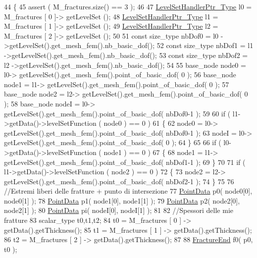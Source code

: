 \begin{DoxyCode}
44 \{   
45     assert ( M\_fractures.size() == 3 );
46     
47     \hyperlink{LevelSetHandler_8h_aba343569cb3213c103252f69c39cad0b}{LevelSetHandlerPtr\_Type} l0 = M\_fractures [ 0 ]-> getLevelSet ();
48     \hyperlink{LevelSetHandler_8h_aba343569cb3213c103252f69c39cad0b}{LevelSetHandlerPtr\_Type} l1 = M\_fractures [ 1 ]-> getLevelSet ();
49     \hyperlink{LevelSetHandler_8h_aba343569cb3213c103252f69c39cad0b}{LevelSetHandlerPtr\_Type} l2 = M\_fractures [ 2 ]-> getLevelSet ();
50     
51     \textcolor{keyword}{const} size\_type nbDof0 = l0 ->getLevelSet().get\_mesh\_fem().nb\_basic\_dof();
52     \textcolor{keyword}{const} size\_type nbDof1 = l1 ->getLevelSet().get\_mesh\_fem().nb\_basic\_dof();
53     \textcolor{keyword}{const} size\_type nbDof2 = l2 ->getLevelSet().get\_mesh\_fem().nb\_basic\_dof();
54     
55     base\_node node0 = l0-> getLevelSet().get\_mesh\_fem().point\_of\_basic\_dof( 0 );
56     base\_node node1 = l1-> getLevelSet().get\_mesh\_fem().point\_of\_basic\_dof( 0 );
57     base\_node node2 = l2-> getLevelSet().get\_mesh\_fem().point\_of\_basic\_dof( 0 );
58     base\_node nodeI = l0-> getLevelSet().get\_mesh\_fem().point\_of\_basic\_dof( nbDof0-1 );
59 
60     \textcolor{keywordflow}{if} ( l1->getData()->levelSetFunction ( node0 ) == 0 )
61     \{
62         node0 = l0-> getLevelSet().get\_mesh\_fem().point\_of\_basic\_dof( nbDof0-1 );
63         nodeI = l0-> getLevelSet().get\_mesh\_fem().point\_of\_basic\_dof( 0 );
64     \}
65 
66     \textcolor{keywordflow}{if} ( l0->getData()->levelSetFunction ( node1 ) == 0 )
67     \{
68         node1 = l1-> getLevelSet().get\_mesh\_fem().point\_of\_basic\_dof( nbDof1-1 );
69     \}
70 
71     \textcolor{keywordflow}{if} ( l1->getData()->levelSetFunction ( node2 ) == 0 )
72     \{
73         node2 = l2->  getLevelSet().get\_mesh\_fem().point\_of\_basic\_dof( nbDof2-1 );
74     \}
75 
76     \textcolor{comment}{//Estremi liberi delle fratture +  punto di intersezione}
77     \hyperlink{classPointData}{PointData} p0( node0[0], node0[1] );
78     \hyperlink{classPointData}{PointData} p1( node1[0], node1[1] );
79     \hyperlink{classPointData}{PointData} p2( node2[0], node2[1] );
80     \hyperlink{classPointData}{PointData} pi( nodeI[0], nodeI[1] );
81     
82     \textcolor{comment}{//Spessori delle mie fratture}
83     scalar\_type t0,t1,t2;
84     t0 = M\_fractures [ 0 ] -> getData().getThickness();
85     t1 = M\_fractures [ 1 ] -> getData().getThickness();
86     t2 = M\_fractures [ 2 ] -> getData().getThickness();
87     
88     \hyperlink{classFractureEnd}{FractureEnd} f0( p0, t0 );

\end{DoxyCode}
